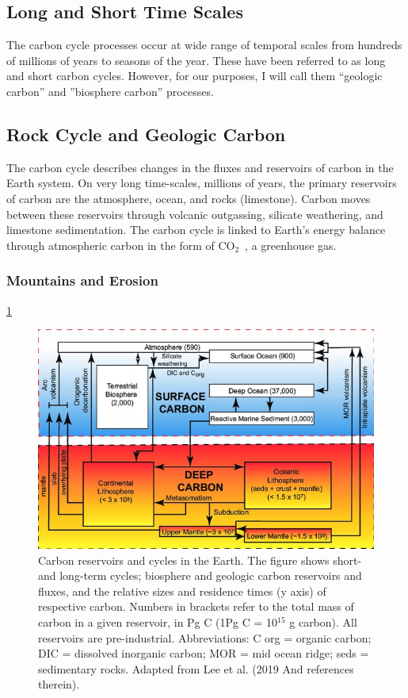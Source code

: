 \documentclass{book}\usepackage{knitr}
\newcommand{\carbondioxide}{CO$_2$~}
\begin{document}
\subsection{Long and Short Time Scales}

The carbon cycle processes occur at wide range of temporal scales from hundreds of millions of years to seasons of the year. These have been referred to as long and short carbon cycles. However, for our purposes, I will call them ``geologic carbon'' and ''biosphere carbon'' processes. 

\subsection{Rock Cycle and Geologic Carbon}

The carbon cycle describes changes in the fluxes and reservoirs of carbon in the Earth system. On very long time-scales, millions of years, the primary reservoirs of carbon are the atmosphere, ocean, and rocks (limestone). Carbon moves between these reservoirs through volcanic outgassing, silicate weathering, and limestone sedimentation. The carbon cycle is linked to Earth's energy balance through atmospheric carbon in the form of \carbondioxide, a greenhouse gas.

\subsubsection{Mountains and Erosion}

\ref{fig:carbonpools}

\begin{figure}
\includegraphics[width=\linewidth]{images/earth-system/Carbon-reservoirs-and-cycles-in-the-Earth.jpg}
\caption{Carbon reservoirs and cycles in the Earth. The figure shows short-and long-term cycles; biosphere and geologic carbon reservoirs and fluxes, and the relative sizes and residence times (y axis) of respective carbon. Numbers in brackets refer to the total mass of carbon in a given reservoir, in Pg C (1Pg C = 10$^{15}$ g carbon). All reservoirs are pre-industrial. Abbreviations: C org = organic carbon; DIC = dissolved inorganic carbon; MOR = mid ocean ridge; seds = sedimentary rocks. Adapted from Lee et al. (2019 And references therein).}
\label{fig:carbonpools}
\end{figure}
\end{document}
